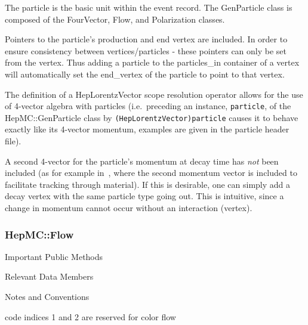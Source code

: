 \documentclass[11pt,letterpaper]{article}
\begin{document}
The particle is the basic unit within the event record. The GenParticle
class is composed of the FourVector, Flow, and Polarization classes. 

Pointers to the particle's production and end vertex are included. In
order to ensure consistency between vertices/particles - these
pointers can only be set from the vertex. Thus adding a particle to
the particles\_in container of a vertex will automatically set the
end\_vertex of the particle to point to that vertex. 

The definition of a HepLorentzVector scope resolution operator allows
for the use of 4-vector algebra with particles (i.e.\ preceding an
instance, \verb!particle!, of the HepMC::GenParticle class by
\verb!(HepLorentzVector)particle!  causes it to behave exactly like
its 4-vector momentum, examples are given in the particle header file).

A second 4-vector for the particle's momentum at decay time has 
{\it not} been included (as for example in~\cite{mc++}, where the
second momentum vector is included to facilitate tracking through
material). If this is desirable, one can simply add a decay vertex
with the same particle type going out. This is intuitive, since a
change in momentum cannot occur without an interaction (vertex).

%
%

\subsubsection{HepMC::Flow}
\begin{myitemize}{Important Public Methods}
\end{myitemize}
\begin{myitemize}{Relevant Data Members}
\end{myitemize}
\begin{myitemize}{Notes and Conventions}
  \item code indices 1 and 2 are reserved for color flow
\end{myitemize}
\end{document}
